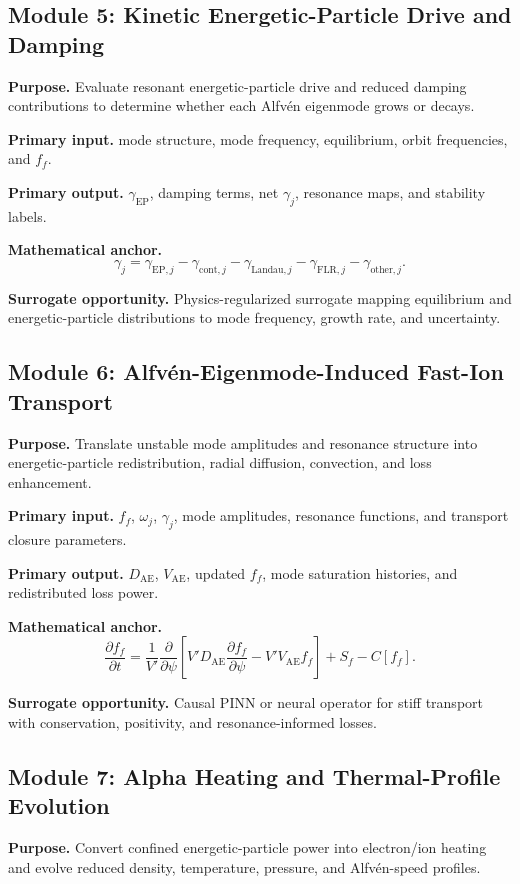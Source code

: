 \documentclass[11pt]{article}
\begin{document}
\subsection{Module 5: Kinetic Energetic-Particle Drive and Damping}
\textbf{Purpose.} Evaluate resonant energetic-particle drive and reduced damping contributions to determine whether each Alfvén eigenmode grows or decays.

\textbf{Primary input.} mode structure, mode frequency, equilibrium, orbit frequencies, and $f_f$.

\textbf{Primary output.} $\gamma_{\mathrm{EP}}$, damping terms, net $\gamma_j$, resonance maps, and stability labels.

\textbf{Mathematical anchor.}
\begin{equation}
\gamma_j=\gamma_{\mathrm{EP},j}-\gamma_{\mathrm{cont},j}-\gamma_{\mathrm{Landau},j}-\gamma_{\mathrm{FLR},j}-\gamma_{\mathrm{other},j}.
\end{equation}

\textbf{Surrogate opportunity.} Physics-regularized surrogate mapping equilibrium and energetic-particle distributions to mode frequency, growth rate, and uncertainty.


\subsection{Module 6: Alfvén-Eigenmode-Induced Fast-Ion Transport}
\textbf{Purpose.} Translate unstable mode amplitudes and resonance structure into energetic-particle redistribution, radial diffusion, convection, and loss enhancement.

\textbf{Primary input.} $f_f$, $\omega_j$, $\gamma_j$, mode amplitudes, resonance functions, and transport closure parameters.

\textbf{Primary output.} $D_{\mathrm{AE}}$, $V_{\mathrm{AE}}$, updated $f_f$, mode saturation histories, and redistributed loss power.

\textbf{Mathematical anchor.}
\begin{equation}
\frac{\partial f_f}{\partial t}=\frac{1}{V\prime}\frac{\partial}{\partial\psi}\left[V\prime D_{\mathrm{AE}}\frac{\partial f_f}{\partial\psi}-V\prime V_{\mathrm{AE}}f_f\right]+S_f-C[f_f].
\end{equation}

\textbf{Surrogate opportunity.} Causal PINN or neural operator for stiff transport with conservation, positivity, and resonance-informed losses.


\subsection{Module 7: Alpha Heating and Thermal-Profile Evolution}
\textbf{Purpose.} Convert confined energetic-particle power into electron/ion heating and evolve reduced density, temperature, pressure, and Alfvén-speed profiles.
\end{document}
